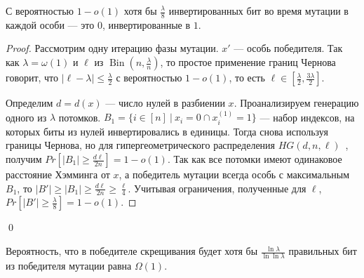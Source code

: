 \documentclass[times]{itmo-student-thesis}
\DeclareMathOperator{\Bin}{Bin}
\begin{document}
\begin{lemma}\label{lem:mut1}
С вероятностью $1- o(1)$ хотя бы $\frac{\lambda}{8}$ инвертированных бит во время мутации в каждой особи --- это $0$, инвертированные в $1$.
\end{lemma}

\begin{proof}
Рассмотрим одну итерацию фазы мутации. $x'$ --- особь победителя.
Так как $\lambda = \omega(1)$ и $\ell$ из $\Bin\left(n, \frac{\lambda}{n}\right)$, то простое применение границ Чернова~\cite{ссылка} говорит, что $|\ell - \lambda| \le \frac{\lambda}{2}$ с вероятностью $1- o(1)$, то есть $\ell \in [\frac{\lambda}{2}, \frac{3\lambda}{2}]$.

Определим $d = d(x)$ --- число нулей в разбиении $x$. Проанализируем генерацию одного из $\lambda$ потомков. $B_1 = \{i \in [n] ~|~ x_i = 0 \cap x^{(1)}_i = 1\}$ --- набор индексов, на которых биты из нулей инвертировались в единицы. Тогда снова используя границы Чернова, но для гипергеометрического распределения $HG(d, n, \ell)$~\cite{ссылка}, получим $Pr[|B_1| \ge \frac{d\ell}{2n}] = 1 - o(1)$.
Так как все потомки имеют одинаковое расстояние Хэмминга от $x$, а победитель мутации всегда особь с максимальным $B_1$, то $|B'| \ge |B_1| \ge \frac{d\ell}{2n} \ge \frac{\ell}{4}$. Учитывая ограничения, полученные для $\ell$, $Pr[|B'| \ge \frac{\lambda}{8}] = 1 - o(1)$.
\end{proof}\qed

\begin{lemma}\label{lem:mut2}
Вероятность, что в победителе скрещивания будет хотя бы $\frac{\ln \lambda}{\ln \ln \lambda}$ правильных бит из победителя мутации равна $\Omega(1)$.
\end{lemma}
\end{document}
